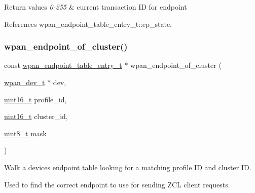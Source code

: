\begin{DoxyRetVals}{Return values}
{\em 0-\/255} & current transaction ID for endpoint \\
\hline
\end{DoxyRetVals}


References wpan\+\_\+endpoint\+\_\+table\+\_\+entry\+\_\+t\+::ep\+\_\+state.

\mbox{\label{group__wpan__aps_ga2cc975231963e0eb75c449c11b1d95de}} 
\subsubsection{\texorpdfstring{wpan\+\_\+endpoint\+\_\+of\+\_\+cluster()}{wpan\_endpoint\_of\_cluster()}}
{\footnotesize\ttfamily const \hyperlink{structwpan__endpoint__table__entry__t}{wpan\+\_\+endpoint\+\_\+table\+\_\+entry\+\_\+t} $\ast$ wpan\+\_\+endpoint\+\_\+of\+\_\+cluster (\begin{DoxyParamCaption}\item[{\hyperlink{structwpan__dev__t}{wpan\+\_\+dev\+\_\+t} $\ast$}]{dev,  }\item[{\hyperlink{group__hal__dos_ga5a8b2dc9e45a9ee81a94ef304fb62505}{uint16\+\_\+t}}]{profile\+\_\+id,  }\item[{\hyperlink{group__hal__dos_ga5a8b2dc9e45a9ee81a94ef304fb62505}{uint16\+\_\+t}}]{cluster\+\_\+id,  }\item[{\hyperlink{group__hal__dos_gae1affc9ca37cfb624959c866a73f83c2}{uint8\+\_\+t}}]{mask }\end{DoxyParamCaption})}



Walk a device\textquotesingle{}s endpoint table looking for a matching profile ID and cluster ID. 

Used to find the correct endpoint to use for sending Z\+CL client requests.


